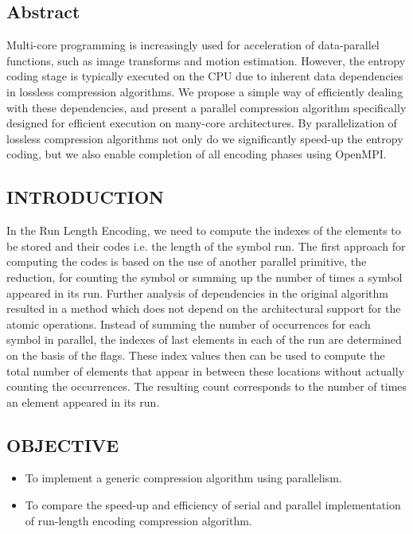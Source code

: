 \documentclass[a4paper, 12pt]{article}
\begin{document}
\newpage
\begin{center}
    \section{Abstract}
\end{center}
Multi-core programming is increasingly used for acceleration of data-parallel functions, such as
image transforms and motion estimation. However, the entropy coding stage is typically executed
on the CPU due to inherent data dependencies in lossless compression algorithms. We propose a
simple way of efficiently dealing with these dependencies, and present a parallel compression
algorithm specifically designed for efficient execution on many-core architectures. By
parallelization of lossless compression algorithms not only do we significantly speed-up the
entropy coding, but we also enable completion of all encoding phases using OpenMPI.


\newpage
\begin{center}
\section{INTRODUCTION}
\end{center}
\hspace{1cm}
\par

In the Run Length Encoding, we need to compute the indexes of the elements to be stored and their codes i.e. the length of the symbol run. The first approach for computing the codes is based on the use of another parallel primitive, the reduction, for counting the symbol or summing up the number of times a symbol appeared in its run. Further analysis of dependencies in the original algorithm resulted in a method which does not depend on the architectural support for the atomic operations. Instead of summing the number of occurrences for each symbol in parallel, the indexes of last elements in each of the run are determined on the basis of the flags. These index values then can be used to compute the total number of elements that appear in between these locations without actually counting the occurrences. The resulting count corresponds to the number of times an element appeared in its run.



\newpage
\begin{center}
\section{OBJECTIVE}
\end{center}
\begin{itemize}
    \item To implement a generic compression algorithm using parallelism.
    \item To compare the speed-up and efficiency of serial and parallel implementation of
run-length encoding compression algorithm.
\end{itemize}
\end{document}
